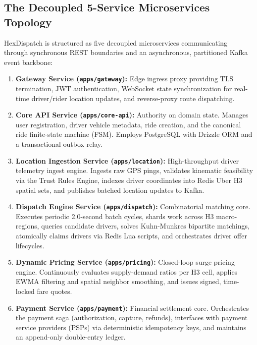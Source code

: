 \documentclass[11pt,a4paper]{article}
\begin{document}
\subsection{The Decoupled 5-Service Microservices Topology}
HexDispatch is structured as five decoupled microservices communicating through synchronous REST boundaries and an asynchronous, partitioned Kafka event backbone:
\begin{enumerate}[leftmargin=1.5em]
    \item \textbf{Gateway Service (\texttt{apps/gateway}):} Edge ingress proxy providing TLS termination, JWT authentication, WebSocket state synchronization for real-time driver/rider location updates, and reverse-proxy route dispatching.
    \item \textbf{Core API Service (\texttt{apps/core-api}):} Authority on domain state. Manages user registration, driver vehicle metadata, ride creation, and the canonical ride finite-state machine (FSM). Employs PostgreSQL with Drizzle ORM and a transactional outbox relay.
    \item \textbf{Location Ingestion Service (\texttt{apps/location}):} High-throughput driver telemetry ingest engine. Ingests raw GPS pings, validates kinematic feasibility via the Trust Rules Engine, indexes driver coordinates into Redis Uber H3 spatial sets, and publishes batched location updates to Kafka.
    \item \textbf{Dispatch Engine Service (\texttt{apps/dispatch}):} Combinatorial matching core. Executes periodic 2.0-second batch cycles, shards work across H3 macro-regions, queries candidate drivers, solves Kuhn-Munkres bipartite matchings, atomically claims drivers via Redis Lua scripts, and orchestrates driver offer lifecycles.
    \item \textbf{Dynamic Pricing Service (\texttt{apps/pricing}):} Closed-loop surge pricing engine. Continuously evaluates supply-demand ratios per H3 cell, applies EWMA filtering and spatial neighbor smoothing, and issues signed, time-locked fare quotes.
    \item \textbf{Payment Service (\texttt{apps/payment}):} Financial settlement core. Orchestrates the payment saga (authorization, capture, refunds), interfaces with payment service providers (PSPs) via deterministic idempotency keys, and maintains an append-only double-entry ledger.
\end{enumerate}
\end{document}

